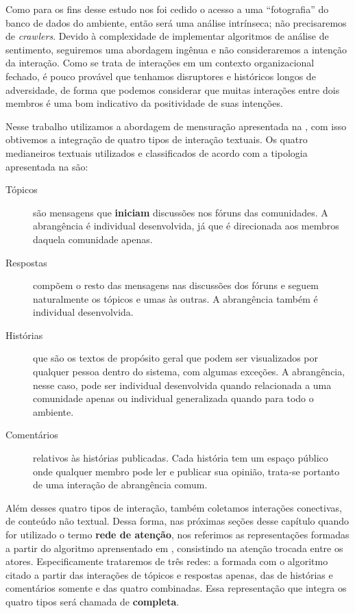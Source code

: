 Como para os fins desse estudo nos foi cedido o acesso a uma ``fotografia'' do
banco de dados do ambiente, então será uma análise intrínseca; não precisaremos
de \emph{crawlers}. Devido à complexidade de implementar algoritmos de análise de
sentimento, seguiremos uma abordagem ingênua e não consideraremos a intenção da
interação. Como se trata de interações em um contexto organizacional fechado, é
pouco provável que tenhamos disruptores e históricos longos de adversidade, de
forma que podemos considerar que muitas interações entre dois membros é uma bom
indicativo da positividade de suas intenções.

Nesse trabalho utilizamos a abordagem de mensuração apresentada na 
, com isso obtivemos a integração de quatro tipos
de interação textuais. Os quatro medianeiros textuais utilizados e
classificados de acordo com a tipologia apresentada na 
são:

\begin{description}
\item[Tópicos] são mensagens que \textbf{iniciam} discussões nos fóruns das
comunidades. A abrangência é individual desenvolvida, já que é direcionada aos
membros daquela comunidade apenas.
\item[Respostas] compõem o resto das mensagens nas discussões dos fóruns e
seguem naturalmente os tópicos e umas às outras. A abrangência também é
individual desenvolvida.
\item[Histórias] que são os textos de propósito geral que podem ser visualizados
por qualquer pessoa dentro do sistema, com algumas exceções. A abrangência,
nesse caso, pode ser individual desenvolvida quando relacionada a uma comunidade
apenas ou individual generalizada quando para todo o ambiente.
\item[Comentários] relativos às histórias publicadas. Cada história tem um
espaço público onde qualquer membro pode ler e publicar sua opinião, trata-se
portanto de uma interação de abrangência comum.
\end{description}

Além desses quatro tipos de interação, também coletamos interações conectivas, de
conteúdo não textual. Dessa forma, nas próximas seções desse capítulo quando for
utilizado o termo \textbf{rede de atenção}, nos referimos as representações
formadas a partir do algoritmo aprensentado em ,
consistindo na atenção trocada entre os atores. Especificamente trataremos de
três redes: a formada com o algoritmo citado a partir das interações de tópicos e
respostas apenas, das de histórias e comentários somente e das quatro combinadas.
Essa representação que integra os quatro tipos será chamada de \textbf{completa}.

